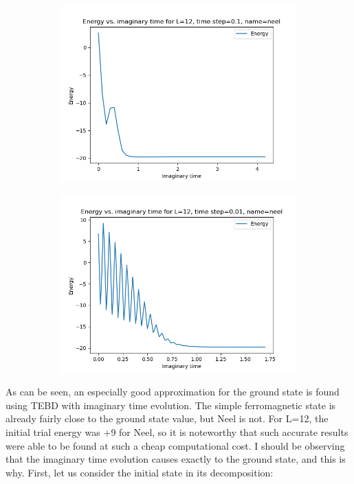 \documentclass[12pt]{article}
\begin{document}
\begin{figure}
\begin{subfigure}{.5\textwidth}
  \centering
  \includegraphics[width=\linewidth]{p4_1_energy_L_12_time_step_0.1_name_neel.png}
  \label{fig:2a}
\end{subfigure}
\begin{subfigure}{.5\textwidth}
  \centering
  \includegraphics[width=\linewidth]{p4_1_energy_L_12_time_step_0.01_name_neel.png}
  \label{fig:2b}
\end{subfigure}

\end{figure}
As can be seen, an especially good approximation for the ground state is found using TEBD with imaginary time evolution. The simple ferromagnetic state is already fairly close to the ground state value, but Neel is not. For L=12, the initial trial energy was +9 for Neel, so it is noteworthy that such accurate results were able to be found at such a cheap computational cost. I should be observing that the imaginary time evolution causes exactly to the ground state, and this is why. First, let us consider the initial state in its decomposition:
\end{document}
